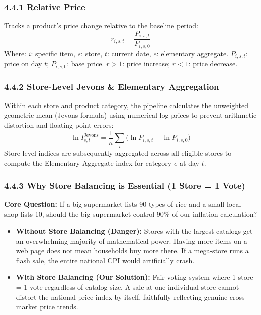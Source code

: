 \documentclass[10pt,a4paper]{article}
\begin{document}
\subsubsection*{4.4.1 Relative Price}
\noindent
Tracks a product's price change relative to the baseline period:
\begin{equation*}
    r_{i, s, t} = \frac{P_{i, s, t}}{P_{i, s, 0}}
\end{equation*}
Where: $i$: specific item, $s$: store, $t$: current date, $e$: elementary aggregate. $P_{i, s, t}$: price on day $t$; $P_{i, s, 0}$: base price. $r > 1$: price increase; $r < 1$: price decrease.

\subsubsection*{4.4.2 Store-Level Jevons \& Elementary Aggregation}
\noindent
Within each store and product category, the pipeline calculates the unweighted geometric mean (Jevons formula) using numerical log-prices to prevent arithmetic distortion and floating-point errors:
\begin{equation*}
    \ln I_{s, t}^{\text{Jevons}} = \frac{1}{n} \sum_{i} \Big( \ln P_{i, s, t} - \ln P_{i, s, 0} \Big)
\end{equation*}
Store-level indices are subsequently aggregated across all eligible stores to compute the Elementary Aggregate index for category $e$ at day $t$.

\subsubsection*{4.4.3 Why Store Balancing is Essential (1 Store = 1 Vote)}
\noindent
\textbf{Core Question:} If a big supermarket lists 90 types of rice and a small local shop lists 10, should the big supermarket control 90\% of our inflation calculation?
\begin{itemize}[noitemsep,topsep=1pt,leftmargin=*]
    \item \textbf{Without Store Balancing (Danger):} Stores with the largest catalogs get an overwhelming majority of mathematical power. Having more items on a web page does not mean households buy more there. If a mega-store runs a flash sale, the entire national CPI would artificially crash.
    \item \textbf{With Store Balancing (Our Solution):} Fair voting system where 1 store = 1 vote regardless of catalog size. A sale at one individual store cannot distort the national price index by itself, faithfully reflecting genuine cross-market price trends.
\end{itemize}
\end{document}
